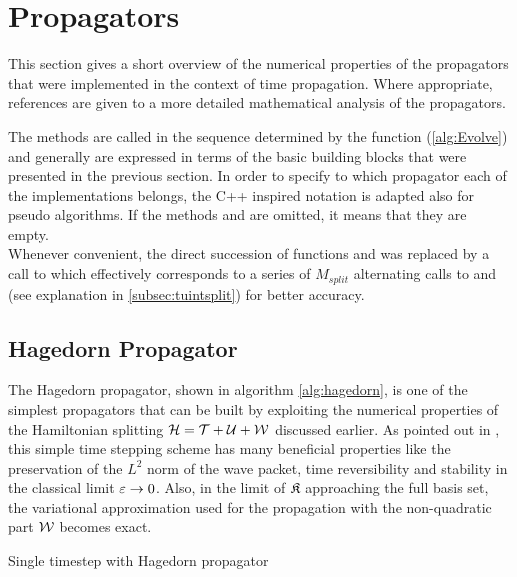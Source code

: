 \section{Propagators}
\label{sec:propagators}

This section gives a short overview of the numerical properties of the propagators that were implemented in the context of time propagation.
Where appropriate, references are given to a more detailed mathematical analysis of the propagators.
\par\medskip
The methods are called in the sequence determined by the  function (\ref{alg:Evolve}) and generally are expressed in terms of the basic building blocks that were presented in the previous section.
In order to specify to which propagator each of the implementations belongs, the C++ inspired notation  is adapted also for pseudo algorithms.
If the methods  and  are omitted, it means that they are empty. \\
Whenever convenient, the direct succession of functions  and  was replaced by a call to  which effectively corresponds to a series of $M_{split}$ alternating calls to  and  (see explanation in \ref{subsec:tuintsplit}) for better accuracy.

\subsection{Hagedorn Propagator}
\label{sub:hagedorn_propagator}
%
The Hagedorn propagator, shown in algorithm \ref{alg:hagedorn}, is one of the simplest propagators that can be built by exploiting the numerical properties of the Hamiltonian splitting $\mathcal{H} = \mathcal{T} + \mathcal{U} + \mathcal{W}$ discussed earlier.
As pointed out in \cite{FGL_semiclassical_dynamics}, this simple time stepping scheme has many beneficial properties like the preservation of the $L^2$ norm of the wave packet, time reversibility and stability in the classical limit $\varepsilon \rightarrow 0$.
Also, in the limit of $\mathfrak{K}$ approaching the full basis set, the variational approximation used for the propagation with the non-quadratic part $\mathcal{W}$ becomes exact.
\begin{algorithm}[ht]
	\caption{Single timestep with Hagedorn propagator}
	\label{alg:hagedorn}
	\begin{algorithmic}
	\State
		\State
			\State {}
			\State {}
			\State {}
			\State {}
		\State
		\EndProcedure
	\end{algorithmic}
\end{algorithm}


